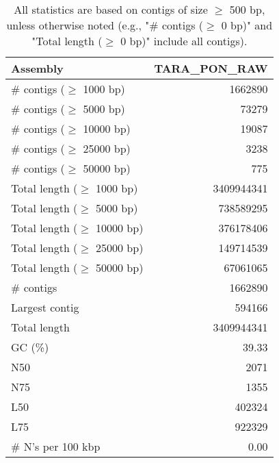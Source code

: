 \documentclass[12pt,a4paper]{article}
\begin{document}
\begin{table}[ht]
\begin{center}
\caption{All statistics are based on contigs of size $\geq$ 500 bp, unless otherwise noted (e.g., "\# contigs ($\geq$ 0 bp)" and "Total length ($\geq$ 0 bp)" include all contigs).}
\begin{tabular}{|l*{1}{|r}|}
\hline
Assembly & TARA\_PON\_RAW \\ \hline
\# contigs ($\geq$ 1000 bp) & 1662890 \\ \hline
\# contigs ($\geq$ 5000 bp) & 73279 \\ \hline
\# contigs ($\geq$ 10000 bp) & 19087 \\ \hline
\# contigs ($\geq$ 25000 bp) & 3238 \\ \hline
\# contigs ($\geq$ 50000 bp) & 775 \\ \hline
Total length ($\geq$ 1000 bp) & 3409944341 \\ \hline
Total length ($\geq$ 5000 bp) & 738589295 \\ \hline
Total length ($\geq$ 10000 bp) & 376178406 \\ \hline
Total length ($\geq$ 25000 bp) & 149714539 \\ \hline
Total length ($\geq$ 50000 bp) & 67061065 \\ \hline
\# contigs & 1662890 \\ \hline
Largest contig & 594166 \\ \hline
Total length & 3409944341 \\ \hline
GC (\%) & 39.33 \\ \hline
N50 & 2071 \\ \hline
N75 & 1355 \\ \hline
L50 & 402324 \\ \hline
L75 & 922329 \\ \hline
\# N's per 100 kbp & 0.00 \\ \hline
\end{tabular}
\end{center}
\end{table}
\end{document}
